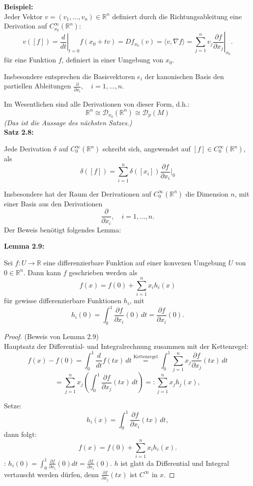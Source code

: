 \documentclass[fleqn, 12pt, letterpaper]{article}
\newcommand{\deldel}[2]{\frac{\partial #1}{\partial #2}}
\begin{document}
\textbf{Beispiel:}\\

Jeder Vektor \( v = (v_1, \dotsc, v_n) \in \mathbb{R}^n \) definiert durch die Richtungsableitung eine Derivation auf \( C_{x_0}^\infty(\mathbb{R}^n) \):
\[
v([f]) = \left. \frac{d}{dt} \right|_{t=0} f(x_0 + t v) = Df_{x_0}(v) = \langle v, \nabla f \rangle = \sum_{j=1}^n v_j \left. \frac{\partial f}{\partial x_j} \right|_{x_0}.
\]
für eine Funktion \( f \), definiert in einer Umgebung von \( x_0 \).

Insbesondere entsprechen die Basisvektoren \( e_i \) der kanonischen Basis den partiellen Ableitungen \(\frac{\partial}{\partial x_i}, \quad i = 1, \dotsc, n.\)

Im Wesentlichen sind alle Derivationen von dieser Form, d.h.:
\[
\mathbb{R}^n \cong \mathcal{D}_{x_0}(\mathbb{R}^n) \cong \mathcal{D}_p(M) 
\]
\textit{(Das ist die Aussage des nächsten Satzes.)}\\

\textbf{Satz 2.8:} 

Jede Derivation \( \delta \) auf \( C_0^\infty(\mathbb{R}^n) \) schreibt sich, angewendet auf \([f] \in C_0^\infty(\mathbb{R}^n)\), als
\[
\delta([f]) = \sum_{i=1}^n \delta([x_i]) \frac{\partial f}{\partial x_i}|_0
\]


\vspace{0.5cm}

Insbesondere hat der Raum der Derivationen auf \( C_0^\infty(\mathbb{R}^n) \) die Dimension \( n \), mit einer Basis aus den Derivationen 
\[
\frac{\partial}{\partial x_i}, \quad i=1, \dotsc, n.
\]
Der Beweis benötigt folgendes Lemma:

\vspace{0.5cm}

\textbf{Lemma 2.9:}

Sei \( f: U \to \mathbb{R} \) eine differenzierbare Funktion auf einer konvexen Umgebung \( U \) von \( 0\in \mathbb{R}^n \).
Dann kann \( f \) geschrieben werden als
\[
f(x) = f(0) + \sum_{i=1}^n x_i h_i(x)
\]
für gewisse differenzierbare Funktionen \( h_i \), mit
\[
h_i(0) = \int_{0}^{1}  \frac{\partial f}{\partial x_i}(0)\,dt  = \frac{\partial f}{\partial x_i}(0).
\]
\begin{proof}
    (Beweis von Lemma 2.9)\\
    Hauptsatz der Differential- und Integralrechnung zusammen mit der Kettenregel:
\[
f(x) - f(0) = \int_0^1 \frac{d}{dt} f(tx) \, dt 
\overset{\text{Kettenregel}}{=} \int_0^1 \sum_{j=1}^n x_j \frac{\partial f}{\partial x_j}(tx) \, dt\]
\[= \sum_{j=1}^n x_j \left( \int_0^1 \frac{\partial f}{\partial x_j}(tx) \, dt \right)
=: \sum_{j=1}^n x_j h_j(x),\]

\vspace{0.5cm}

Setze:
\[
h_i(x) = \int_0^1 \frac{\partial f}{\partial x_i}(tx) \, dt,
\]
dann folgt:
\[
f(x) = f(0) + \sum_{i=1}^n x_i h_i(x).
\]
: 
\( h_i(0)= \int_0^1\frac{\partial f}{\partial x_i}(0) dt= \frac{\partial f}{\partial x_i}(0) \). \( h \) ist glatt da Differential und Integral vertauscht werden dürfen, denn $\deldel{f}{x_j}(tx)$ ist $C^{\infty}$ in $x$.
\end{proof}
\end{document}
